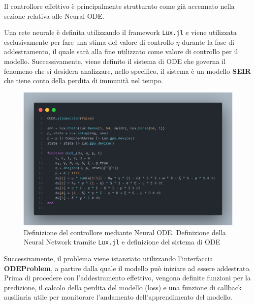 Il controllore effettivo è principalmente strutturato come già 
accennato nella sezione relativa alle Neural ODE.

Una rete neurale è definita utilizzando il framework 
\texttt{Lux.jl} \cite{pal2023lux} e viene utilizzata esclusivamente per 
fare una stima del valore di controllo $\eta$ durante la fase di 
addestramento, il quale sarà alla fine utilizzato come valore di 
controllo per il modello. Successivamente, viene definito il sistema 
di ODE che governa il fenomeno che si desidera analizzare, 
nello specifico, il sistema è un modello \textbf{SEIR} che tiene 
conto della perdita di immunità nel tempo.

\begin{figure}[H]
    \begin{center}
		\includegraphics[width=\textwidth]{img/fann.png}
		\caption{Definizione del controllore mediante Neural ODE. Definizione della Neural Network tramite \texttt{Lux.jl} e definizione del sistema di ODE}
		\label{fig:controller1}
	\end{center}
\end{figure}

Successivamente, il problema viene istanziato utilizzando 
l'interfaccia \textbf{ODEProblem}, a partire dalla quale il modello 
può iniziare ad essere addestrato. Prima di procedere con 
l'addestramento effettivo, vengono definite funzioni per la predizione, 
il calcolo della perdita del modello (loss) e una funzione di callback 
ausiliaria utile per monitorare l'andamento dell'apprendimento del modello.

